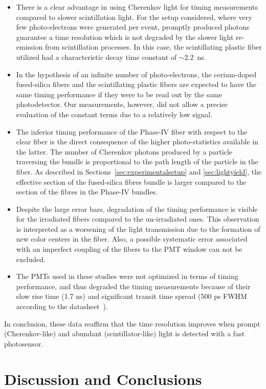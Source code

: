 \documentclass[a4paper,11pt]{article}
\begin{document}
\begin{itemize}
\item There is a clear advantage in using Cherenkov light for timing measurements compared to slower scintillation light. For the setup considered, where very few photo-electrons were generated per event, promptly produced photons guarantee a time resolution which is not degraded by the slower light re-emission from scintillation processes. In this case, the scintillating plastic fiber utilized had a characteristic decay time constant of $\sim$2.2~ns.
\item In the hypothesis of an infinite number of photo-electrons, the cerium-doped fused-silica fibers and the scintillating plastic fibers are expected to have the same timing performance if they were to be read out by the same photodetector. Our measurements, however, did not allow a precise evaluation of the constant terms due to a relatively low signal.
\item The inferior timing performance of the Phase-IV fiber with respect to the clear fiber is the direct consequence of the higher photo-statistics available in the latter. The number of Cherenkov photons produced by a particle traversing the bundle is proportional to the path length of the particle in the fiber. As described in Sections~\ref{sec:experimentalsetup} and \ref{sec:lightyield}, the effective section of the fused-silica fibres bundle is larger compared to the section of the fibres in the Phase-IV bundles.
\item Despite the large error bars, degradation of the timing performance is visible for the irradiated fibers compared to the un-irradiated ones. This observation is interpreted as a worsening of the light transmission due to the formation of new color centers in the fiber. Also, a possible systematic error associated with an imperfect coupling of the fibers to the PMT window can not be excluded.
\item The PMTs used in these studies were not optimized in terms of timing performance, and thus degraded the timing measurements because of their slow rise time (1.7 ns) and significant transit time spread (500 ps FWHM according to the datasheet~\cite{r-PMT}).
\end{itemize}
In conclusion, these data reaffirm that the time resolution improves when prompt (Cherenkov-like) and abundant (scintillator-like) light is detected with a fast photosensor.

\section{Discussion and Conclusions}
\label{sec:conclusions}
\end{document}
